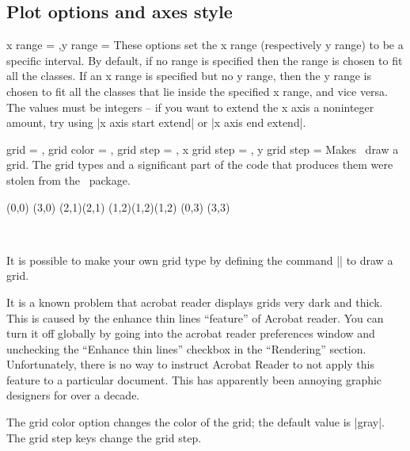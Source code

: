 \begin{sseqdata}[name = basic, cohomological Serre grading]
\subsection{Plot options and axes style}
\begin{keylist}{x range = ,y range = }
These options set the x range (respectively y range) to be a specific interval. By default, if no range is specified then the range is chosen to fit all the classes. If an x range is specified but no y range, then the y range is chosen to fit all the classes that lie inside the specified x range, and vice versa. The values must be integers -- if you want to extend the x axis a noninteger amount, try using |x axis start extend| or |x axis end extend|.
\end{keylist}

\begin{keylist}{
    grid = ,
    grid color = ,
    grid step = ,
    x grid step = ,
    y grid step = 
}
Makes \sseqpages\  draw a grid. The grid types and a significant part of the code that produces them were stolen from the \sseqpkg\ package.
\begin{codeexample}[vbox]
\begin{sseqdata}[ name = grid example, scale = 0.8 ]
\class(0,0)
\class(3,0)
\class(2,1)\class(2,1)
\class(1,2)\class(1,2)\class(1,2)
\class(0,3)
\class(3,3)
\end{sseqdata}
\hbox{
\printpage[ name = grid example, grid = chess, title=chess ]
\qquad
\printpage[ name = grid example, grid = crossword, title=crossword ]
}
\vskip20pt
\hbox{
\printpage[ name = grid example, grid = go, title=go ]
\qquad
\printpage[ name = grid example, grid = none ]
}
\end{codeexample}
It is possible to make your own grid type by defining the command |\sseq@grid@yourgridname| to draw a grid.

It is a known problem that acrobat reader displays grids very dark and thick. This is caused by the enhance thin lines ``feature'' of Acrobat reader. You can turn it off globally by going into the acrobat reader preferences window and unchecking the ``Enhance thin lines'' checkbox in the ``Rendering'' section. Unfortunately, there is no way to instruct Acrobat Reader to not apply this feature to a particular document. This has apparently been annoying graphic designers for over a decade.

The grid color option changes the color of the grid; the default value is |gray|.
The grid step keys change the grid step.
\end{keylist}


\end{sseqdata}
